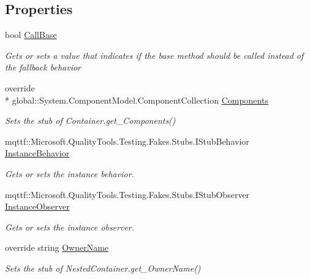 \subsection*{Properties}
\begin{DoxyCompactItemize}
\item 
bool \hyperlink{class_system_1_1_component_model_1_1_fakes_1_1_stub_nested_container_aef7c0c22ee8d41442fe4f5442d680474}{Call\-Base}
\begin{DoxyCompactList}\small\item\em Gets or sets a value that indicates if the base method should be called instead of the fallback behavior\end{DoxyCompactList}\item 
override \\*
global\-::\-System.\-Component\-Model.\-Component\-Collection \hyperlink{class_system_1_1_component_model_1_1_fakes_1_1_stub_nested_container_a6aad5575d71c729bf4368904d7a118e1}{Components}
\begin{DoxyCompactList}\small\item\em Sets the stub of Container.\-get\-\_\-\-Components()\end{DoxyCompactList}\item 
mqttf\-::\-Microsoft.\-Quality\-Tools.\-Testing.\-Fakes.\-Stubs.\-I\-Stub\-Behavior \hyperlink{class_system_1_1_component_model_1_1_fakes_1_1_stub_nested_container_a1e3e4e8c2981745f8e9356c401984179}{Instance\-Behavior}
\begin{DoxyCompactList}\small\item\em Gets or sets the instance behavior.\end{DoxyCompactList}\item 
mqttf\-::\-Microsoft.\-Quality\-Tools.\-Testing.\-Fakes.\-Stubs.\-I\-Stub\-Observer \hyperlink{class_system_1_1_component_model_1_1_fakes_1_1_stub_nested_container_a1975dbce58cd5b3fd133f0a1e8f8743e}{Instance\-Observer}
\begin{DoxyCompactList}\small\item\em Gets or sets the instance observer.\end{DoxyCompactList}\item 
override string \hyperlink{class_system_1_1_component_model_1_1_fakes_1_1_stub_nested_container_a049cca127cd42698fd319a4662c1d0a4}{Owner\-Name}
\begin{DoxyCompactList}\small\item\em Sets the stub of Nested\-Container.\-get\-\_\-\-Owner\-Name()\end{DoxyCompactList}\end{DoxyCompactItemize}


